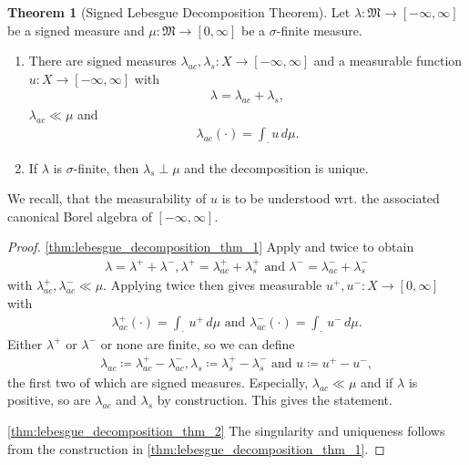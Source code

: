 \documentclass[10pt, leqno]{amsart}
\theoremstyle{definition}
\newtheorem{theorem}{Theorem}[section]
\theoremstyle{remark}
\begin{document}
    \begin{theorem}[Signed Lebesgue Decomposition Theorem]
        Let \(\lambda\colon \mathfrak{M} \to [-\infty, \infty]\) be a signed measure and \(\mu\colon \mathfrak{M} \to [0, \infty]\) be a \(\sigma\)-finite measure.
        \begin{enumerate}[label=(\roman*), wide]
            \item \label{thm:lebesgue_decomposition_thm_1} There are signed measures \(\lambda_{ac}, \lambda_s\colon X \to [-\infty, \infty]\) and a measurable function \(u\colon X \to [-\infty, \infty]\) with
            \begin{align}
                \lambda = \lambda_{ac} + \lambda_s,
            \end{align}
            \(\lambda_{ac} \ll \mu\) and
            \begin{align}
                \lambda_{ac}(\cdot) = \int_{\cdot} u \, d\mu.
            \end{align}
            \item \label{thm:lebesgue_decomposition_thm_2} If \(\lambda\) is \(\sigma\)-finite, then \(\lambda_s \perp \mu\) and the decomposition is unique.
        \end{enumerate}
    \end{theorem}

    We recall, that the measurability of \(u\) is to be understood wrt. the associated canonical Borel algebra of \([-\infty, \infty]\).

    \begin{proof}
        \ref{thm:lebesgue_decomposition_thm_1} Apply  and  twice to obtain
        \begin{align}
            \lambda = \lambda^+ + \lambda^-, \lambda^+ = \lambda^+_{ac} + \lambda^+_s \text{ and } \lambda^- = \lambda^-_{ac} + \lambda^-_s
        \end{align}
        with \(\lambda^+_{ac}, \lambda^-_{ac} \ll \mu\). Applying  twice then gives measurable \(u^+, u^-\colon X \to [0, \infty]\) with
        \begin{align}
            \lambda^+_{ac}(\cdot) = \int_\cdot \, u^+ \, d \mu \text{ and } \lambda^-_{ac}(\cdot) = \int_\cdot \, u^- \, d \mu.
        \end{align}
        Either \(\lambda^+\) or \(\lambda^-\) or none are finite, so we can define
        \begin{align}
            \lambda_{ac} \coloneqq \lambda^+_{ac} - \lambda^-_{ac}, \lambda_s \coloneqq \lambda^+_s - \lambda^-_s \text{ and } u \coloneqq u^+ - u^-,
        \end{align}
        the first two of which are signed measures. Especially, \(\lambda_{ac} \ll \mu\) and if \(\lambda\) is positive, so are \(\lambda_{ac}\) and \(\lambda_s\) by construction. This gives the statement.

        \ref{thm:lebesgue_decomposition_thm_2} The singularity and uniqueness follows from the construction in \ref{thm:lebesgue_decomposition_thm_1}.
    \end{proof}
\end{document}
